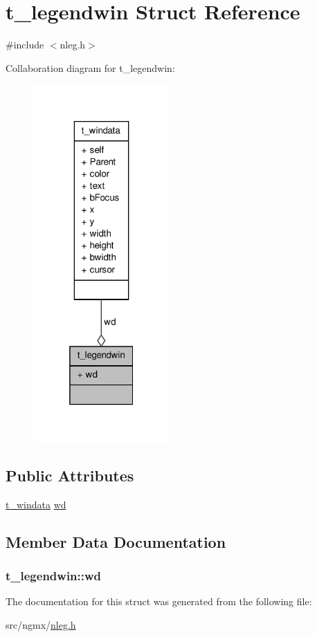 \hypertarget{structt__legendwin}{\section{t\-\_\-legendwin \-Struct \-Reference}
\label{structt__legendwin}
}


{\ttfamily \#include $<$nleg.\-h$>$}



\-Collaboration diagram for t\-\_\-legendwin\-:
\nopagebreak
\begin{figure}[H]
\begin{center}
\leavevmode
\includegraphics[width=148pt]{structt__legendwin__coll__graph}
\end{center}
\end{figure}
\subsection*{\-Public \-Attributes}
\begin{DoxyCompactItemize}
\item 
\hyperlink{structt__windata}{t\-\_\-windata} \hyperlink{structt__legendwin_a7e1331f5d68a456a38bedfe1b238b9d0}{wd}
\end{DoxyCompactItemize}


\subsection{\-Member \-Data \-Documentation}
\hypertarget{structt__legendwin_a7e1331f5d68a456a38bedfe1b238b9d0}{
\subsubsection[{wd}]{ {\bf t\-\_\-legendwin\-::wd}}}\label{structt__legendwin_a7e1331f5d68a456a38bedfe1b238b9d0}


\-The documentation for this struct was generated from the following file\-:\begin{DoxyCompactItemize}
\item 
src/ngmx/\hyperlink{nleg_8h}{nleg.\-h}\end{DoxyCompactItemize}
